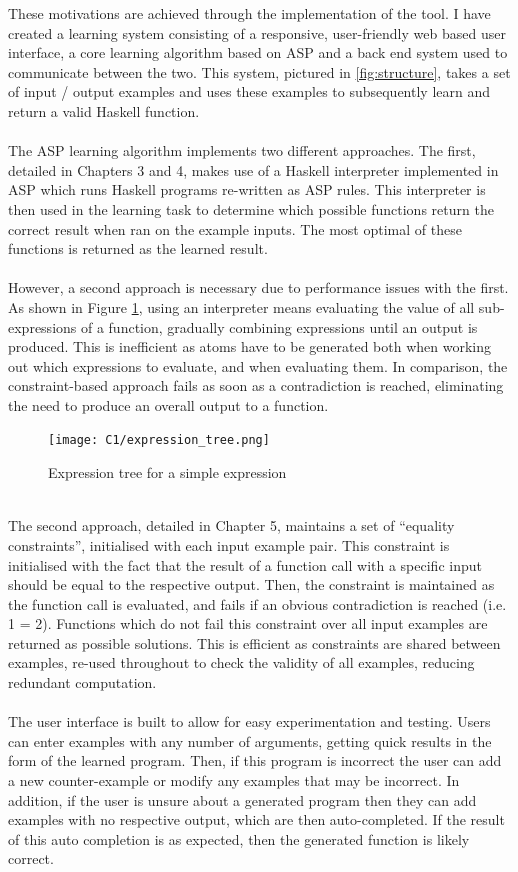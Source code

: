 These motivations are achieved through the implementation of the tool. I have created a learning system consisting of a responsive, user-friendly web based user interface, a core learning algorithm based on ASP and a back end system used to communicate between the two. This system, pictured in \ref{fig:structure}, takes a set of input / output examples and uses these examples to subsequently learn and return a valid Haskell function. \\ \\
The ASP learning algorithm implements two different approaches. The first, detailed in Chapters 3 and 4, makes use of a Haskell interpreter implemented in ASP which runs Haskell programs re-written as ASP rules. This interpreter is then used in the learning task to determine which possible functions return the correct result when ran on the example inputs. The most optimal of these functions is returned as the learned result. \\ \\
However, a second approach is necessary due to performance issues with the first. As shown in Figure \ref{fig:expr_tree}, using an interpreter means evaluating the value of all sub-expressions of a function, gradually combining expressions until an output is produced. This is inefficient as atoms have to be generated both when working out which expressions to evaluate, and when evaluating them. In comparison, the constraint-based approach fails as soon as a contradiction is reached, eliminating the need to produce an overall output to a function.

\begin{figure}[h!]
\centering
\texttt{[image: C1/expression\_tree.png]}
\caption{Expression tree for a simple expression}
\label{fig:expr_tree}
\end{figure}
\mbox{}\\
The second approach, detailed in Chapter 5, maintains a set of ``equality constraints'', initialised with each input example pair. This constraint is initialised with the fact that the result of a function call with a specific input should be equal to the respective output. Then, the constraint is maintained as the function call is evaluated, and fails if an obvious contradiction is reached (i.e. 1 = 2). Functions which do not fail this constraint over all input examples are returned as possible solutions. This is efficient as constraints are shared between examples, re-used throughout to check the validity of all examples, reducing redundant computation. \\ \\
The user interface is built to allow for easy experimentation and testing. Users can enter examples with any number of arguments, getting quick results in the form of the learned program. Then, if this program is incorrect the user can add a new counter-example or modify any examples that may be incorrect. In addition, if the user is unsure about a generated program then they can add examples with no respective output, which are then auto-completed. If the result of this auto completion is as expected, then the generated function is likely correct.

